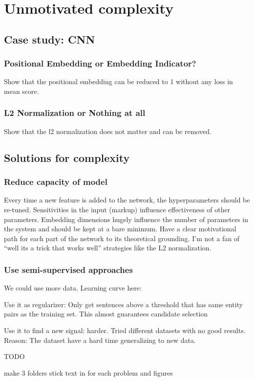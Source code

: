 
\section{Unmotivated complexity}

\subsection{Case study: CNN}

\subsubsection{Positional Embedding or Embedding Indicator?}
Show that the positional embedding can be reduced to 1 without any loss in mean score. 

\subsubsection{L2 Normalization or Nothing at all}
Show that the l2 normalization does not matter and can be removed.

\subsection{Solutions for complexity}

\subsubsection{Reduce capacity of model}
Every time a new feature is added to the network, the hyperparameters should be re-tuned. Sensitivities in the input (markup) influence effectiveness of other parameters. Embedding dimensions hugely influence the number of parameters in the system and should be kept at a bare minimum. 
Have a clear motivational path for each part of the network to its theoretical grounding. I'm not a fan of ``well its a trick that works well'' strategies like the L2 normalization.

\subsubsection{Use semi-supervised approaches}

We could use more data. Learning curve here:


Use it as regularizer: Only get sentences above a threshold that has same entity pairs as the training set. This almost guarantees candidate selection

Use it to find a new signal: harder. Tried different datasets with no good results. 
Reason: The dataset have a hard time generalizing to new data.  

TODO

make 3 folders
stick text in for each problem
and figures

